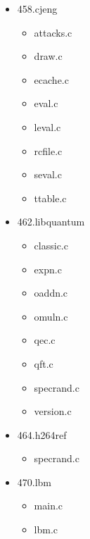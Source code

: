 \begin{multicols}{3}
\begin{itemize}
	\item 458.cjeng
	\begin{itemize}
		\item attacks.c
		\item draw.c
		\item ecache.c
		\item eval.c
		\item leval.c
		\item rcfile.c
		\item seval.c
		\item ttable.c
	\end{itemize}

	\item 462.libquantum
	\begin{itemize}
		\item classic.c
		\item expn.c
		\item oaddn.c
		\item omuln.c
		\item qec.c
		\item qft.c
		\item specrand.c
		\item version.c
	\end{itemize}

	\item 464.h264ref
	\begin{itemize}
		\item specrand.c
	\end{itemize}

	\item 470.lbm
	\begin{itemize}
		\item main.c
		\item lbm.c
	\end{itemize}


\end{itemize}
\end{multicols}

